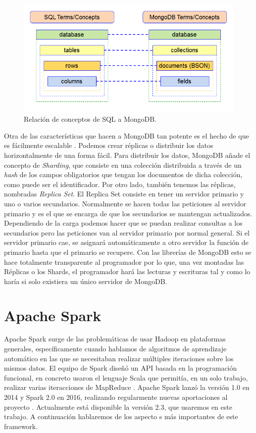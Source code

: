 \begin{figure}[htp]
\centering
\includegraphics[scale=0.57]{Imagenes/mongo1.png}
\caption{Relación de conceptos de SQL a MongoDB.}
\label{Mng-img-1}
\end{figure}


Otra de las características que hacen a MongoDB tan potente es el hecho de
que es fácilmente escalable \cite{Mng-1}. Podemos crear réplicas o
distribuir los datos horizontalmente de una forma fácil. Para distribuir
los datos, MongoDB añade el concepto de \emph{Sharding}, que consiste en una
colección distribuida a través de un \emph{hash} de los campos obligatorios que
tengan los documentos de dicha colección, como puede ser el identificador. Por otro
lado, también tenemos las réplicas, nombradas \emph{Replica Set}. El Replica Set
consiste en tener un servidor primario y uno o varios secundarios.
Normalmente se hacen todas las peticiones al servidor primario y es el que
se encarga de que los secundarios se mantengan actualizados. Dependiendo de
la carga podemos hacer que se puedan realizar consultas a los secundarios
pero las peticiones van al servidor primario por normal general. Si el
servidor primario cae, se asignará automáticamente a otro servidor la
función de primario hasta que el primario se recupere. Con las librerías de
MongoDB esto se hace totalmente transparente al programador por lo que, una
vez montadas las Réplicas o los Shards, el programador hará las lecturas y
escrituras tal y como lo haría si solo existiera un único servidor de
MongoDB.

\section{Apache Spark\label{Spark}}

Apache Spark surge de las problemáticas de usar Hadoop en plataformas
generales, específicamente cuando hablamos de algoritmos de aprendizaje
automático en las que se necesitaban realizar múltiples iteraciones sobre
los mismos datos. El equipo de Spark diseñó un API basada en la
programación funcional, en concreto usaron el lenguaje Scala que permitía,
en un solo trabajo, realizar varias iteracciones de MapReduce
\cite{Spk-1}. Apache Spark lanzó la versión 1.0 en 2014 y Spark 2.0 en
2016, realizando regularmente nuevas aportaciones al proyecto \cite{Spk-2}.
Actualmente está disponible la versión 2.3, que usaremos en este trabajo. A
continuación hablaremos de los aspecto s más importantes de este framework.

